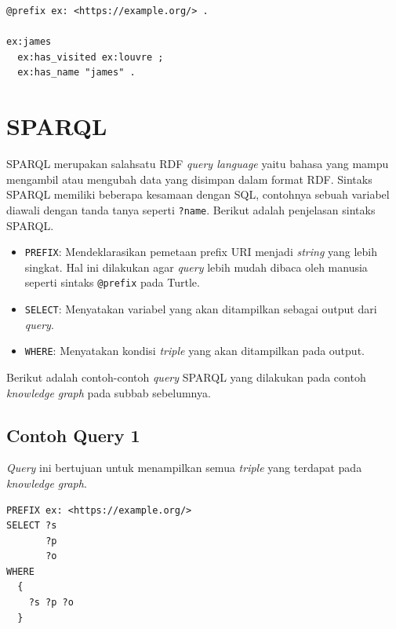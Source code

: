 \begin{verbatim}
@prefix ex: <https://example.org/> .

ex:james 
  ex:has_visited ex:louvre ;
  ex:has_name "james" .
\end{verbatim}

\section{SPARQL}\label{sparql}

SPARQL merupakan salahsatu RDF \textit{query language} yaitu bahasa yang mampu mengambil atau mengubah
data yang disimpan dalam format RDF. Sintaks SPARQL memiliki beberapa kesamaan dengan SQL, contohnya
sebuah variabel diawali dengan tanda tanya seperti \texttt{?name}. Berikut adalah penjelasan sintaks
SPARQL.

\begin{itemize}
  \itemsep1pt\parskip0pt
  \item \texttt{PREFIX}: Mendeklarasikan pemetaan prefix URI menjadi \textit{string} yang lebih
        singkat. Hal ini dilakukan agar \textit{query} lebih mudah dibaca oleh manusia seperti sintaks
        \texttt{@prefix} pada Turtle.
  \item \texttt{SELECT}: Menyatakan variabel yang akan ditampilkan sebagai output dari \textit{query}.
  \item \texttt{WHERE}: Menyatakan kondisi \textit{triple} yang akan ditampilkan pada output.
\end{itemize}

Berikut adalah contoh-contoh \textit{query} SPARQL yang dilakukan pada contoh \textit{knowledge graph}
pada subbab sebelumnya.

\subsection{Contoh Query 1}\label{contoh-query-1}

\textit{Query} ini bertujuan untuk menampilkan semua \textit{triple} yang terdapat pada \textit{knowledge
  graph}.

\begin{listing}[ht]
  \begin{verbatim}
PREFIX ex: <https://example.org/>
SELECT ?s 
       ?p
       ?o
WHERE
  {
    ?s ?p ?o
  }
  \end{verbatim}
  \caption{Example from external file}
  \label{listing:3}
\end{listing}

